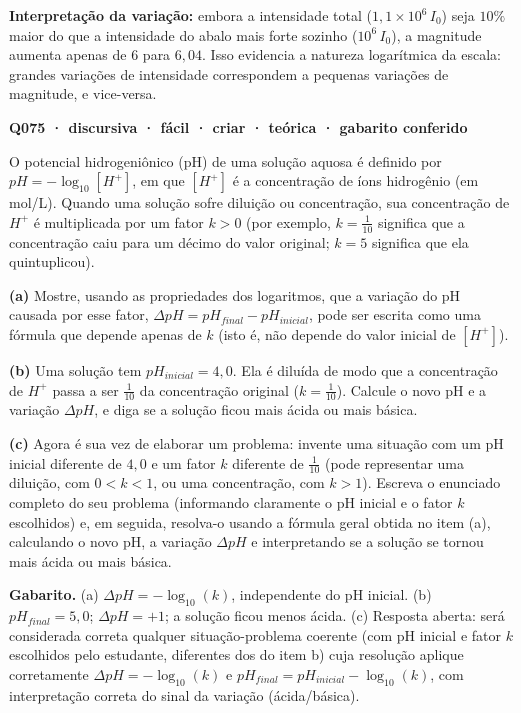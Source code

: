 \documentclass[11pt,a4paper]{article}
\begin{document}
\textbf{Interpretação da variação:} embora a intensidade total ($1{,}1\times10^6\,I_0$) seja $10\%$ maior do que a intensidade do abalo mais forte sozinho ($10^6\,I_0$), a magnitude aumenta apenas de $6$ para $6{,}04$. Isso evidencia a natureza logarítmica da escala: grandes variações de intensidade correspondem a pequenas variações de magnitude, e vice-versa.

\bigskip\noindent\textbf{Q075 · discursiva · fácil · criar · teórica · gabarito conferido}\par\nopagebreak
O potencial hidrogeniônico (pH) de uma solução aquosa é definido por $pH = -\log_{10}[H^+]$, em que $[H^+]$ é a concentração de íons hidrogênio (em mol/L). Quando uma solução sofre diluição ou concentração, sua concentração de $H^+$ é multiplicada por um fator $k>0$ (por exemplo, $k = \tfrac{1}{10}$ significa que a concentração caiu para um décimo do valor original; $k=5$ significa que ela quintuplicou).

\textbf{(a)} Mostre, usando as propriedades dos logaritmos, que a variação do pH causada por esse fator, $\Delta pH = pH_{final} - pH_{inicial}$, pode ser escrita como uma fórmula que depende apenas de $k$ (isto é, não depende do valor inicial de $[H^+]$).

\textbf{(b)} Uma solução tem $pH_{inicial} = 4{,}0$. Ela é diluída de modo que a concentração de $H^+$ passa a ser $\tfrac{1}{10}$ da concentração original ($k = \tfrac{1}{10}$). Calcule o novo pH e a variação $\Delta pH$, e diga se a solução ficou mais ácida ou mais básica.

\textbf{(c)} Agora é sua vez de elaborar um problema: invente uma situação com um pH inicial diferente de $4{,}0$ e um fator $k$ diferente de $\tfrac{1}{10}$ (pode representar uma diluição, com $0<k<1$, ou uma concentração, com $k>1$). Escreva o enunciado completo do seu problema (informando claramente o pH inicial e o fator $k$ escolhidos) e, em seguida, resolva-o usando a fórmula geral obtida no item (a), calculando o novo pH, a variação $\Delta pH$ e interpretando se a solução se tornou mais ácida ou mais básica.

\textbf{Gabarito.} (a) $\Delta pH = -\log_{10}(k)$, independente do pH inicial. (b) $pH_{final}=5{,}0$; $\Delta pH = +1$; a solução ficou menos ácida. (c) Resposta aberta: será considerada correta qualquer situação-problema coerente (com pH inicial e fator $k$ escolhidos pelo estudante, diferentes dos do item b) cuja resolução aplique corretamente $\Delta pH=-\log_{10}(k)$ e $pH_{final}=pH_{inicial}-\log_{10}(k)$, com interpretação correta do sinal da variação (ácida/básica).
\end{document}
